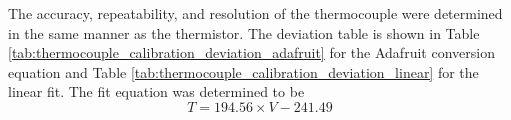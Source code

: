 The accuracy, repeatability, and resolution of the thermocouple were determined in the same manner as the thermistor. The deviation table is shown in
Table \ref{tab:thermocouple_calibration_deviation_adafruit} for the Adafruit conversion equation and Table \ref{tab:thermocouple_calibration_deviation_linear} 
for the linear fit. The fit equation was determined to be
\begin{equation}
    T = 194.56 \times V - 241.49 \label{eq:thermocouple_calibration}
\end{equation}


